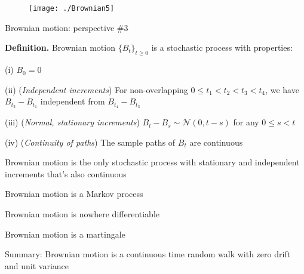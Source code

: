 \documentclass[11pt, aspectratio=169]{beamer}
\newenvironment{witemize}{\itemize\addtolength{\itemsep}{10pt}}{\enditemize}
\begin{document}
\begin{frame}{}
	\begin{figure}
		\texttt{[image: ./Brownian5]}
	\end{figure}
\end{frame}


\begin{frame}{Brownian motion: perspective \#3}

\vspace{4mm}
\textbf{Definition.} Brownian motion $\{B_t\}_{t\geq 0}$ is a stochastic process with properties:
\begin{witemize}
\item [(i)] $B_0 = 0$

\vspace{-3mm}
\item [(ii)] (\textit{Independent increments}) For non-overlapping $0 \leq t_1 < t_2 < t_3 < t_4$, we have $B_{t_2} - B_{t_1}$ independent from $B_{t_4} - B_{t_3}$

\vspace{-3mm}
\item [(iii)] (\textit{Normal, stationary increments}) $B_t - B_s \sim \mathcal N(0, t-s)$ for any $0 \leq s < t$

\vspace{-3mm}
\item [(iv)]  (\textit{Continuity of paths}) The sample paths of $B_t$ are continuous
\end{witemize}

\end{frame}


\begin{frame}{}
\begin{witemize}
\item Brownian motion is the only stochastic process with stationary and independent increments that's also continuous

\item Brownian motion is a Markov process

\item Brownian motion is nowhere differentiable

\item Brownian motion is a martingale

\item Summary: Brownian motion is a continuous time random walk with zero drift and unit variance 	
\end{witemize}
\end{frame}
\end{document}
